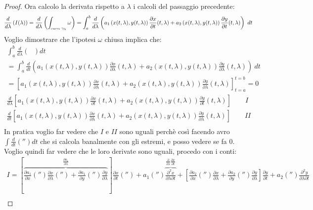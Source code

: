 \documentclass[a4paper, oneside]{article}
\newcommand\de{\partial}
\begin{document}
\begin{proof}
    Ora calcolo la derivata rispetto a $\lambda$ i calcoli del passaggio precedente:
    \begin{gather*}
        \frac{d}{d\lambda}\left(I(\lambda) \right) = \frac{d}{d\lambda}\left(\int_{\text{\tiny curva \normalsize}\gamma_\lambda} \omega\right)  = \int_{a}^{b} \frac{d}{d\lambda}\left(a_1 \left( x(t,\lambda) , y (t,\lambda) \right) \frac{\partial x}{\partial t}(t,\lambda) + a_2 \left( x(t,\lambda) , y (t,\lambda) \right) \frac{\partial y}{\partial t}(t,\lambda)\right)  \ dt
    \end{gather*}
    Voglio dimostrare che l'ipotesi $\omega$ chiusa implica che:
    \begin{gather*}
        \int_{a}^{b} \frac{d}{d \lambda}\left( \ \ \  \right)dt\\
        = \int_{a}^{b} \frac{d}{dt}\left( a_1(x(t, \lambda),y(t, \lambda))\frac{\partial x}{\partial \lambda}(t, \lambda) + a_2(x(t, \lambda),y(t, \lambda))\frac{\partial y}{\partial \lambda}(t, \lambda)\right)  \ dt \\
        = \left[a_1(x(t, \lambda),y(t, \lambda))\frac{\partial x}{\partial \lambda}(t, \lambda) + a_2(x(t, \lambda),y(t, \lambda))\frac{\partial y}{\partial \lambda}(t, \lambda)\right]_{t=a}^{t=b} = 0 
    \end{gather*}
    \begin{gather*}
        \frac{d}{d\lambda}\left[ a_1(x(t,\lambda),y(t,\lambda)) \frac{\partial x}{\partial t}(t, \lambda) + a_2(x(t,\lambda),y(t,\lambda)) \frac{\partial y}{\partial t}(t, \lambda) \right] \qquad \boxed{I} \\
        \frac{d}{d t}\left[a_1(x(t, \lambda),y(t, \lambda))\frac{\partial x}{\partial \lambda}(t, \lambda) + a_2(x(t, \lambda),y(t, \lambda))\frac{\partial y}{\partial \lambda}(t, \lambda)\right] \qquad \boxed{II}\\
    \end{gather*}
    In pratica voglio far vedere che $I$ e $II$ sono uguali perchè così facendo avro $\int \frac{d}{dt} ('') dt$ che si calcola banalmente con gli estremi, e posso vedere se fa $0$.\\
    Voglio quindi far vedere che le loro derivate sono uguali, procedo con i conti:
    \begin{gather*}
        \boxed{I} = \left[ \overbrace{\frac{\partial a_1}{\partial x}( '' ) \frac{\partial x}{\partial \lambda}( '' )+ \frac{\partial a_1}{\partial y}( '' )\frac{\partial y}{\partial \lambda}}^{\frac{\de a_1}{\de \lambda}}\right]\frac{\partial x}{\partial t}( '' ) + a_1( '' ) \overbrace{\frac{\partial^2 x}{\partial \lambda \partial t}}^{\frac{\de}{\de \lambda} \frac{\de x}{\de t}} + \left[ \frac{\partial a_2}{\partial x}( '' )\frac{\partial x}{\partial \lambda} + \frac{\partial a_2}{\partial y}( '' )\frac{\partial y}{\partial \lambda} \right]\frac{\partial y}{\partial t} + a_2( '' )\frac{\partial^2 y}{\partial \lambda \partial t}\\

\end{gather*}
\end{proof}
\end{document}
